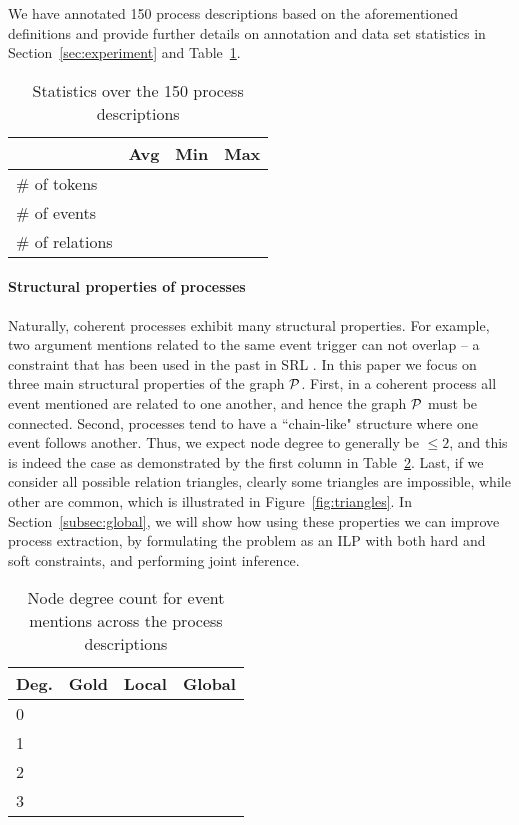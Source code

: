 We have annotated 150 process descriptions based on the aforementioned definitions and provide further details on annotation and data set statistics in Section~\ref{sec:experiment} and Table~\ref{tab:datastats}.

\begin{table}[t]
{\small
\hfill{}
\begin{tabular}{|l|r|r|r|}
\hline
&\textbf{Avg}&\textbf{Min} & \textbf{Max}\\
\hline
\# of tokens            &            &           &   \\ 
\# of events                &           &          &    \\ 
\# of relations          &            &              & \\ 
\hline
\end{tabular}}
\hfill{}
\caption{Statistics over the 150 process descriptions}
\label{tab:datastats}
\end{table}

\paragraph{Structural properties of processes} 
Naturally, coherent processes exhibit many structural properties. For example, two argument mentions related to the same event trigger can not overlap -- a constraint that has been used in the past in SRL \cite{Toutanova08}. In this paper we focus on three main structural properties of the graph $\mathcal{P}$. First, in a coherent process all event mentioned are related to one another, and hence the graph $\mathcal{P}$ must be connected. Second, processes tend to have a ``chain-like" structure where one event follows another. Thus, we expect node degree to generally be $\leq 2$, and this is indeed the case as demonstrated by the first column in Table~\ref{tab:degree}. Last, if we consider all possible relation triangles, clearly some triangles are impossible, while other are common, which is illustrated in Figure~\ref{fig:triangles}. In Section~\ref{subsec:global}, we will show how using these properties we can improve process extraction, by formulating the problem as an ILP with both hard and soft constraints, and performing joint inference.

\begin{table}[t]
{\small
\hfill{}
\begin{tabular}{|l|r|r|r|}
\hline
\textbf{Deg.} &\textbf{Gold}&\textbf{Local} & \textbf{Global}\\
\hline
0            &            &           &   \\ 
1            &            &           &   \\ 
2                &           &          &    \\ 
3          &            &              & \\ 
\hline
\end{tabular}}
\hfill{}
\caption{Node degree count for event mentions across the process descriptions}
\label{tab:degree}
\end{table}

